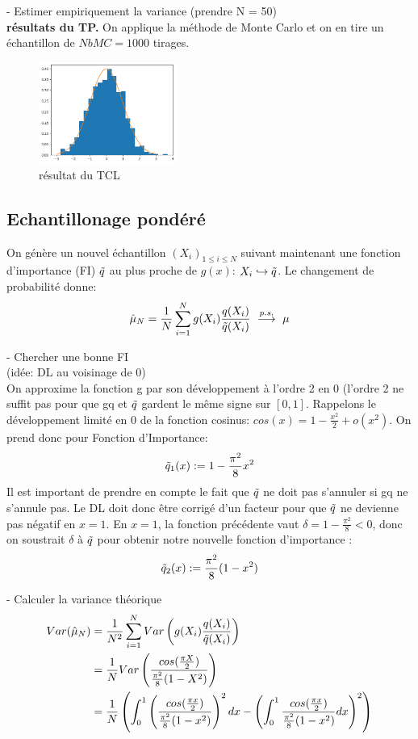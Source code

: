 \documentclass{article}
\begin{document}
- Estimer empiriquement la variance (prendre N = 50)\\
\textbf{résultats du TP.}
On applique la méthode de Monte Carlo et on en tire un échantillon de $NbMC=1000$ tirages.

\begin{figure}[ht]
\centering
\includegraphics[width=0.4\textwidth]{TP1/MC_brute_TCL.png}
\caption{résultat du TCL}
\end{figure}

\subsection{Echantillonage pondéré}
On génère un nouvel échantillon $(X_i)_{1\leq i \leq N}$ suivant maintenant une fonction d'importance (FI) $\Tilde{q}$ au plus proche de $g(x)$: $X_i \hookrightarrow \Tilde{q}$. Le changement de probabilité donne: 
$$ \hat{\mu}_N = \frac1{N} \sum_{i=1}^N g(X_i)\frac{q(X_i)}{\Tilde{q}(X_i)}\ \overset{p.s.}{\longrightarrow}\ \mu $$

- Chercher une bonne FI\\
(idée: DL au voisinage de 0)  \\
On approxime la fonction g par son développement à l'ordre 2 en 0 (l'ordre 2 ne suffit pas pour que gq et $\Tilde{q}$ gardent le même signe sur $[0,1]$. Rappelons le développement limité en 0 de la fonction cosinus: 
$ cos(x) = 1 - \frac{x^2}{2} + o(x^2) $.
On prend donc pour Fonction d'Importance: 
$$\Tilde{q}_1(x):= 1 - \frac{\pi^2}{8} x^2 $$
Il est important de prendre en compte le fait que $\Tilde{q}$ ne doit pas s'annuler si gq ne s'annule pas. Le DL doit donc être corrigé d'un facteur pour que $\Tilde{q}$ ne devienne pas négatif en $x=1$. En $x=1$, la fonction précédente vaut $\delta = 1 - \frac{\pi^2}{8} < 0$, donc on soustrait $\delta$ à $\Tilde{q}$ pour obtenir notre nouvelle fonction d'importance :
$$\Tilde{q}_2(x):= \frac{\pi^2}{8}(1 - x^2) $$

- Calculer la variance théorique\\
\begin{align*} 
  Var(\hat{\mu}_N) &= \frac1{N^2} \sum_{i=1}^N Var \left ( g(X_i)\frac{q(X_i)}{\Tilde{q}(X_i)}\right)\\ 
  &= \frac1{N} Var\left (\frac{cos(\frac{\pi X}2)}{\frac{\pi^2}{8} (1 - X^2)} \right ) \\ 
  &= \frac1{N} \left ( \int_0^1 \left (\frac{cos(\frac{\pi x}2)}{\frac{\pi^2}{8} (1 -  x^2)} \right )^2dx - \left ( \int_0^1 \frac{cos(\frac{\pi x}2)}{\frac{\pi^2}{8} (1 -  x^2)}dx \right )^2 \right )\\
\end{align*}
\end{document}
